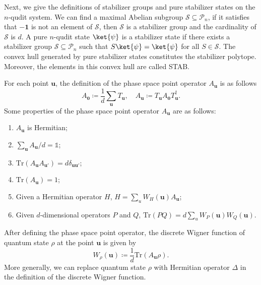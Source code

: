 \documentclass[aps,pra,twocolumn,floatfix,amsfonts,10pt]{revtex4-2}
\begin{document}
Next, we give the definitions of stabilizer groups and pure stabilizer states on the $n$-qudit system.
We can find a maximal Abelian subgroup $\mathcal{S} \subseteq \mathcal{P}_n$, if it satisfies that $-\mathbf{1}$ is not an element of $\mathcal{S}$, then $\mathcal{S}$ is a stabilizer group and the cardinality of $\mathcal{S}$ is $d$. 
A pure $n$-qudit state $\ket{\psi}$ is a stabilizer state if there exists a stabilizer group $\mathcal{S} \subseteq \mathcal{P}_n$ such that $S \ket{\psi} = \ket{\psi}$ for all $S \in \mathcal{S}$.
The convex hull generated by pure stabilizer states constitutes the stabilizer polytope. 
Moreover, the elements in this convex hull are called STAB.

For each point $\mathbf{u}$, the definition of the phase space point operator $A_{\mathbf{u}}$ is as follows \cite{G2007}
\begin{equation}
	A_\mathbf{0} \coloneqq \frac{1}{d}\displaystyle\sum_{\mathbf{u}}T_{\mathbf{u}}, \quad A_{\mathbf{u}} \coloneqq T_{\mathbf{u}}A_{\mathbf{0}}T_{\mathbf{u}}^{\dagger}.
\end{equation}
Some properties of the phase space point operator $A_{\mathbf{u}}$ are as follows:

\begin{enumerate}
	\item $A_{\mathbf{u}}$ is Hermitian;
	\item $\sum_{\mathbf{u}}A_{\mathbf{u}}/d = \mathds{1}$;
	\item $\mathrm{Tr}(A_{\mathbf{u}}A_{\mathbf{u}'}) = d \delta_{\mathbf{u}\mathbf{u}'}$;
	\item $\mathrm{Tr}(A_{\mathbf{u}}) = 1$;
	\item Given a Hermitian operator $H$, $H = \sum_{u}W_H(\mathbf{u})A_{\mathbf{u}}$;
	\item Given $d$-dimensional operators $P$ and $Q$, $\mathrm{Tr}(PQ)=d\sum_{u}W_P(\mathbf{u})W_Q(\mathbf{u})$.
\end{enumerate}

After defining the phase space point operator, the discrete Wigner function of quantum state $\rho$ at the point $\mathbf{u}$ is given by
\begin{equation}
	W_{\rho}(\mathbf{u}) \coloneqq \frac{1}{d}\mathrm{Tr}(A_{\mathbf{u}}\rho).
\end{equation}
More generally, we can replace quantum state $\rho$ with Hermitian operator $\Delta$ in the definition of the discrete Wigner function.
\end{document}

